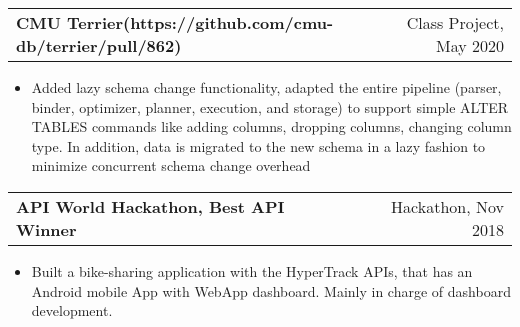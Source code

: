 \documentclass[letterpaper,11pt]{article}
\makeatletter
\newcommand{\resumeItem}[2]{
  \item\small{
    \textbf{#1}{: #2 \vspace{-3pt}}
  }
}
\newcommand{\resumeLine}[1]{
  \item\small{
    #1 \vspace{-2.5pt}
  }
}
\newcommand{\resumeSubheadingSingle}[2]{
  \vspace{-1pt}\item
    \begin{tabular*}{0.97\textwidth}[t]{l@{\extracolsep{\fill}}r}
      \textbf{#1} & #2 \\
    \end{tabular*}\vspace{-5pt}
}
\newcommand{\resumeSubItem}[2]{\resumeItem{#1}{#2}\vspace{-4pt}}
\newcommand{\resumeItemListStart}{\begin{itemize}}
\newcommand{\resumeItemListEnd}{\end{itemize}\vspace{-5pt}}
\makeatother
\begin{document}

    \resumeSubheadingSingle
    {CMU Terrier(https://github.com/cmu-db/terrier/pull/862)}{Class Project, May 2020} 
    \resumeItemListStart
    \resumeLine{Added lazy schema change functionality, adapted the entire pipeline (parser, binder, optimizer, planner, execution, and storage) to support simple ALTER TABLES commands like adding columns, dropping columns, changing column type. In addition, data is migrated to the new schema in a lazy fashion to minimize concurrent schema change overhead }
    \resumeItemListEnd

    \resumeSubheadingSingle
    {API World Hackathon, Best API Winner} {Hackathon, Nov 2018}
    \resumeItemListStart
    \resumeLine{Built a bike-sharing application with the HyperTrack APIs, that has an Android mobile App with WebApp dashboard. Mainly in charge of dashboard development.}
    \resumeItemListEnd
\end{document}

